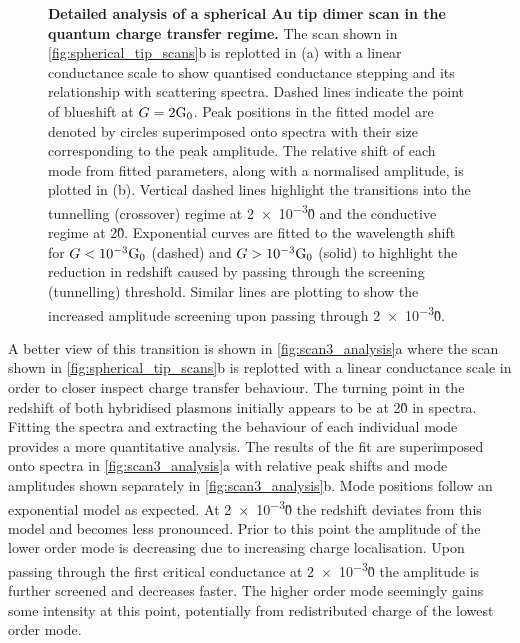 \documentclass[a4paper]{article}
\begin{document}
\begin{figure}[bt]
\caption[Detailed analysis of a spherical Au tip dimer scan in the quantum charge transfer regime]{\textbf{Detailed analysis of a spherical Au tip dimer scan in the quantum charge transfer regime.} The scan shown in \autoref{fig:spherical_tip_scans}b is replotted in (a) with a linear conductance scale to show quantised conductance stepping and its relationship with scattering spectra. Dashed lines indicate the point of blueshift at $G=2\mathrm{G_{0}}$. Peak positions in the fitted model are denoted by circles superimposed onto spectra with their size corresponding to the peak amplitude. The relative shift of each mode from fitted parameters, along with a normalised amplitude, is plotted in (b). Vertical dashed lines highlight the transitions into the tunnelling (crossover) regime at \num{2e-3}\G0 and the conductive regime at 2\G0. Exponential curves are fitted to the wavelength shift for $G<\num{e-3}\mathrm{G_{0}}$ (dashed) and $G>\num{e-3}\mathrm{G_{0}}$ (solid) to highlight the reduction in redshift caused by passing through the screening (tunnelling) threshold. Similar lines are plotting to show the increased amplitude screening upon passing through \num{2e-3}\G0.}
\label{fig:scan3_analysis}
\vspace{-5pt}
\end{figure}

A better view of this transition is shown in \autoref{fig:scan3_analysis}a where the scan shown in \autoref{fig:spherical_tip_scans}b is replotted with a linear conductance scale in order to closer inspect charge transfer behaviour. The turning point in the redshift of both hybridised plasmons initially appears to be at 2\G0 in spectra. Fitting the spectra and extracting the behaviour of each individual mode provides a more quantitative analysis. The results of the fit are superimposed onto spectra in \autoref{fig:scan3_analysis}a with relative peak shifts and mode amplitudes shown separately in \autoref{fig:scan3_analysis}b. Mode positions follow an exponential model as expected. At \num{2e-3}\G0 the redshift deviates from this model and becomes less pronounced. Prior to this point the amplitude of the lower order mode is decreasing due to increasing charge localisation. Upon passing through the first critical conductance at \num{2e-3}\G0 the amplitude is further screened and decreases faster. The higher order mode seemingly gains some intensity at this point, potentially from redistributed charge of the lowest order mode.
\end{document}
